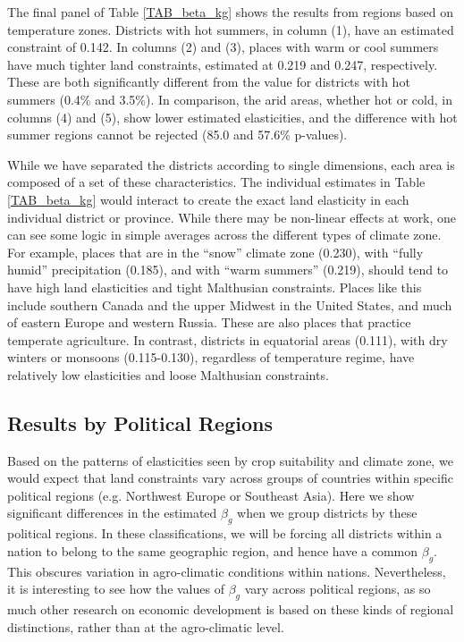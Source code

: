 \documentclass[11pt]{article}
\begin{document}
The final panel of Table \ref{TAB_beta_kg} shows the results from regions based on temperature zones. Districts with hot summers, in column (1), have an estimated constraint of 0.142. In columns (2) and (3), places with warm or cool summers have much tighter land constraints, estimated at 0.219 and 0.247, respectively. These are both significantly different from the value for districts with hot summers (0.4\% and 3.5\%). In comparison, the arid areas, whether hot or cold, in columns (4) and (5), show lower estimated elasticities, and the difference with hot summer regions cannot be rejected (85.0 and 57.6\% p-values).

While we have separated the districts according to single dimensions, each area is composed of a set of these characteristics. The individual estimates in Table \ref{TAB_beta_kg} would interact to create the exact land elasticity in each individual district or province. While there may be non-linear effects at work, one can see some logic in simple averages across the different types of climate zone. For example, places that are in the ``snow'' climate zone (0.230), with ``fully humid'' precipitation (0.185), and with ``warm summers'' (0.219), should tend to have high land elasticities and tight Malthusian constraints. Places like this include southern Canada and the upper Midwest in the United States, and much of eastern Europe and western Russia. These are also places that practice temperate agriculture. In contrast, districts in equatorial areas (0.111), with dry winters or monsoons (0.115-0.130), regardless of temperature regime, have relatively low elasticities and loose Malthusian constraints.

\subsection{Results by Political Regions}
Based on the patterns of elasticities seen by crop suitability and climate zone, we would expect that land constraints vary across groups of countries within specific political regions (e.g. Northwest Europe or Southeast Asia). Here we show significant differences in the estimated $\beta_g$ when we group districts by these political regions. In these classifications, we will be forcing all districts within a nation to belong to the same geographic region, and hence have a common $\beta_g$. This obscures variation in agro-climatic conditions within nations. Nevertheless, it is interesting to see how the values of $\beta_g$ vary across political regions, as so much other research on economic development is based on these kinds of regional distinctions, rather than at the agro-climatic level.
\end{document}
